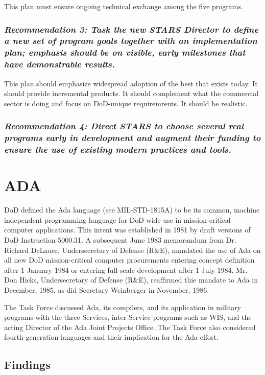 \documentclass[11pt,final]{article}
\begin{document}
This plan must ensure ongoing technical exchange among the five programs.

\label{rec:3}
\subsubsection*{\textit{Recommendation 3: Task the new STARS Director to define a new set of
program goals together with an implementation plan; emphasis should be on
visible, early milestones that have demonstrable results.}}

This plan should emphasize widespread adoption of the best that exists today.
It should provide incremental products. It should complement what the
commercial sector is doing and focus on DoD-unique requiremrents. It should be
realistic.

\label{rec:4}
\subsubsection*{\textit{Recommendation 4: Direct STARS to choose several real
programs early in development and augment their funding to ensure the use of
existing modern practices and tools.}}

\section{ADA}

DoD defined the Ada language (see MIL-STD-1815A) to be its common,
machine independent programming language for DoD-wide use in mission-critical
computer applications. This intent was established in 1981 by draft versions of
DoD Instruction 5000.31. A subsequent June 1983 memorandum from Dr. Richard
DeLauer, Undersecretary of Defense (R\&E), mandated the use of Ada on all new
DoD mission-critical computer procurements entering concept definition after 1
January 1984 or entering full-scale development after 1 July 1984. Mr. Don
Hicks, Undersecretary of Defense (R\&E), reaffirmed thie mandate to Ada in
December, 1985, as did Secretary Weinberger in November, 1986.

The Task Force discussed Ada, its compilers, and its application in military
programs with the three Services, inter-Service programs such as WIS, and the
acting Director of the Ada Joint Projects Office. The Task Force also
considered fourth-generation languages and their implication for the Ada
effort.

\subsection*{Findings}
\end{document}

